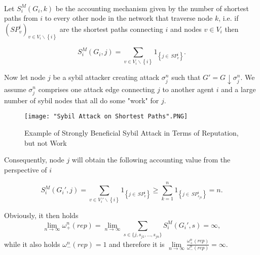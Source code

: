 \begin{example}[]\ \\
\label{ex:Strongly Beneficial in Terms of Reputation, but not Work}
\noindent{}Let $S^M_i(G_i,k)$ be the accounting mechanism given by the number of shortest paths from $i$ to every other node in the network that traverse node $k$, i.e. if $(SP^i_v)_{v\in{}V_i\backslash{}\left\lbrace{}i\right\rbrace}$ are the shortest paths connecting $i$ and nodes $v\in{}V_i$ then
 
\[
S^M_i(G_i,j)=\sum\limits_{v\in{}V_i\backslash\left\lbrace{}i\right\rbrace}1_{\left\lbrace{}j\in{}\,SP^i_v\right\rbrace}.
\]

\noindent{}Now let node $j$ be a sybil attacker creating attack $\sigma^n_j$ such that $G'=G\downarrow\sigma^n_j$. We assume $\sigma^n_j$ comprises one attack edge connecting $j$ to another agent $i$ and a large number of sybil nodes that all do some "work" for $j$. 

\begin{figure}[H]
\begin{center}
\texttt{[image: "Sybil Attack on Shortest Paths".PNG]}
\caption{Example of Strongly Beneficial Sybil Attack in Terms of Reputation, but not Work}
\label{fig:Example of Strongly Beneficial Sybil Attack in Terms of Reputation, but not Work}
\end{center}
\end{figure}

\noindent{}Consequently, node $j$ will obtain the following accounting value from the perspective of $i$ 

\[
S^M_i(G_i',j)=\sum\limits_{v\in{}V_i'\backslash\left\lbrace{}i\right\rbrace}1_{\left\lbrace{}j\in{}\,SP^i_v\right\rbrace} \geq \sum\limits_{k=1}^{n}1_{\left\lbrace{}j\in{}\,SP^i_{s_{jk}}\right\rbrace} = n.
\]

\noindent{}Obviously, it then holds 
\[
\lim\limits_{n\rightarrow\infty}\omega^n_{+}(rep) = \lim\limits_{n\rightarrow\infty}\sum\limits_{s\in\lbrace{}j,s_{j1},\ldots,s_{jn}\rbrace}S^M_i(G_i',s) = \infty,
\]
\noindent{}while it also holds $\omega^n_{-}(rep)=1$ and therefore it is $\lim\limits_{n\rightarrow\infty}\frac{\omega^n_{+}(rep)}{\omega^n_{-}(rep)}=\infty.$ \vspace{1em}\\


\end{example}
